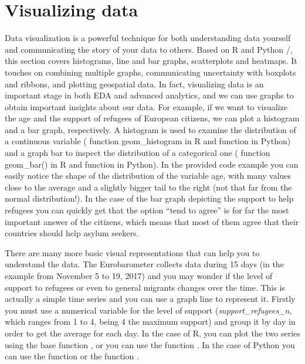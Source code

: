 \section{Visualizing data}

Data visualization is a powerful technique for both understanding data yourself and communicating the story of your data to others. Based on R  and Python /, this section covers histograms, line and bar graphs, scatterplots and heatmaps. It touches on combining multiple graphs, communicating uncertainty with boxplots and ribbons, and plotting geospatial data.  In fact, visualizing data is an important stage in both EDA and advanced analytics, and we can use graphs to obtain important insights about our data. For example, if we want to visualize the age and the support of refugees of European citizens, we can plot a histogram and a bar graph, respectively. A histogram is used to examine the distribution of a continuous variable ( function geom\_histogram in R and  function  in Python) and a graph bar to inspect the distribution of a categorical one ( function geom\_bar() in R and  function  in Python). In the provided code example you can easily notice the shape of the distribution of the variable age, with many values close to the average and a slightly bigger tail to the right (not that far from the normal distribution!).  In the case of the bar graph depicting the support to help refugees you can quickly get that the option “tend to agree” is for far the most important answer of the citizens, which means that most of them agree that their countries should help asylum seekers.


There are many more basic visual representations that can help you to understand the data. The Eurobarometer collects data during 15 days (in the example from November 5 to 19, 2017) and you may wonder if the level of support to refugees or even to general migrants changes over the time. This is actually a simple time series and you can use a graph line to represent it. Firstly you must use a numerical variable for the level of support (\emph{support\_refugees\_n}, which ranges from 1 to 4, being 4 the maximum support) and group it by day in order to get the average for each day. In the case of R, you can plot the two series using the base function , or you can use the  function . In the case of Python you can use the  function  or the  function .	

